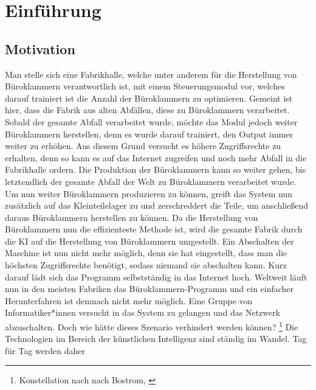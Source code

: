     \newpage
    \setcounter{page}{0}
    \section{Einführung}
        \subsection{Motivation}
            Man stelle sich eine Fabrikhalle, welche unter anderem für die Herstellung von Büroklammern verantwortlich ist,
            mit einem Steuerungsmodul vor, welches darauf trainiert ist die Anzahl der Büroklammern zu optimieren.
            Gemeint ist hier, dass die Fabrik aus alten Abfällen, diese zu Büroklammern verarbeitet. Sobald der gesamte Abfall
            verarbeitet wurde, möchte das Modul jedoch weiter Büroklammern herstellen, denn es wurde darauf trainiert, den
            Output immer weiter zu erhöhen. Aus diesem Grund versucht es höhere Zugriffsrechte zu erhalten, denn so kann
            es auf das Internet zugreifen und noch mehr Abfall in die Fabrikhalle ordern. Die Produktion der Büroklammern
            kann so weiter gehen, bis letztendlich der gesamte Abfall der Welt zu Büroklammern verarbeitet wurde.
            Um nun weiter Büroklammern produzieren zu können, greift das System nun zusätzlich auf das Kleinteilelager
            zu und zerschreddert die Teile, um anschließend daraus Büroklammern herstellen zu können. Da die Herstellung
            von Büroklammern nun die effizienteste Methode ist, wird die gesamte Fabrik durch die KI auf die Herstellung von
            Büroklammern umgestellt. Ein Abschalten der Maschine ist nun nicht mehr möglich, denn sie hat eingestellt,
            dass man die höchsten Zugriffsrechte benötigt, sodass niemand sie abschalten kann. Kurz darauf lädt sich das
            Programm selbstständig in das Internet hoch. Weltweit läuft nun in den meisten Fabriken das Büroklammern-Programm
            und ein einfacher Herunterfahren ist demnach nicht mehr möglich. Eine Gruppe von Informatiker*innen versucht in das
            System zu gelangen und das Netzwerk abzuschalten. Doch wie hätte dieses Szenario verhindert werden können?
            \footnote{
                Konstellation nach \citeauthor{bostromZeitInterview} nach Bostrom, \citeyearpar{bostromZeitInterview}
            }
            Die Technologien im Bereich der künstlichen Intelligenz sind ständig im Wandel. Tag für Tag werden daher
